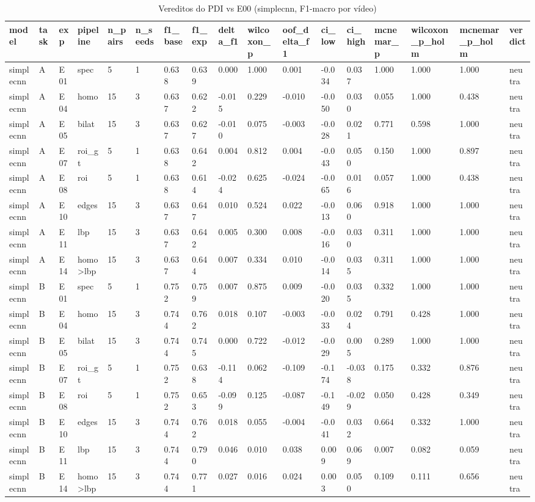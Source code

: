 \begin{table}[ht]
\centering
\caption{Vereditos do PDI vs E00 (simplecnn, F1-macro por vídeo)}
\begin{tabular}{lllllllllllllllll}
\toprule
model & task & exp & pipeline & n\_pairs & n\_seeds & f1\_base & f1\_exp & delta\_f1 & wilcoxon\_p & oof\_delta\_f1 & ci\_low & ci\_high & mcnemar\_p & wilcoxon\_p\_holm & mcnemar\_p\_holm & verdict \\
\midrule
simplecnn & A & E01 & spec & 5 & 1 & 0.638 & 0.639 & 0.000 & 1.000 & 0.001 & -0.034 & 0.037 & 1.000 & 1.000 & 1.000 & neutra \\
simplecnn & A & E04 & homo & 15 & 3 & 0.637 & 0.622 & -0.015 & 0.229 & -0.010 & -0.050 & 0.030 & 0.055 & 1.000 & 0.438 & neutra \\
simplecnn & A & E05 & bilat & 15 & 3 & 0.637 & 0.627 & -0.010 & 0.075 & -0.003 & -0.028 & 0.021 & 0.771 & 0.598 & 1.000 & neutra \\
simplecnn & A & E07 & roi\_gt & 5 & 1 & 0.638 & 0.642 & 0.004 & 0.812 & 0.004 & -0.043 & 0.050 & 0.150 & 1.000 & 0.897 & neutra \\
simplecnn & A & E08 & roi & 5 & 1 & 0.638 & 0.614 & -0.024 & 0.625 & -0.024 & -0.065 & 0.016 & 0.057 & 1.000 & 0.438 & neutra \\
simplecnn & A & E10 & edges & 15 & 3 & 0.637 & 0.647 & 0.010 & 0.524 & 0.022 & -0.013 & 0.060 & 0.918 & 1.000 & 1.000 & neutra \\
simplecnn & A & E11 & lbp & 15 & 3 & 0.637 & 0.642 & 0.005 & 0.300 & 0.008 & -0.016 & 0.030 & 0.311 & 1.000 & 1.000 & neutra \\
simplecnn & A & E14 & homo>lbp & 15 & 3 & 0.637 & 0.644 & 0.007 & 0.334 & 0.010 & -0.014 & 0.035 & 0.311 & 1.000 & 1.000 & neutra \\
simplecnn & B & E01 & spec & 5 & 1 & 0.752 & 0.759 & 0.007 & 0.875 & 0.009 & -0.020 & 0.035 & 0.332 & 1.000 & 1.000 & neutra \\
simplecnn & B & E04 & homo & 15 & 3 & 0.744 & 0.762 & 0.018 & 0.107 & -0.003 & -0.033 & 0.024 & 0.791 & 0.428 & 1.000 & neutra \\
simplecnn & B & E05 & bilat & 15 & 3 & 0.744 & 0.745 & 0.000 & 0.722 & -0.012 & -0.029 & 0.005 & 0.289 & 1.000 & 1.000 & neutra \\
simplecnn & B & E07 & roi\_gt & 5 & 1 & 0.752 & 0.638 & -0.114 & 0.062 & -0.109 & -0.174 & -0.038 & 0.175 & 0.332 & 0.876 & neutra \\
simplecnn & B & E08 & roi & 5 & 1 & 0.752 & 0.653 & -0.099 & 0.125 & -0.087 & -0.149 & -0.029 & 0.050 & 0.428 & 0.349 & neutra \\
simplecnn & B & E10 & edges & 15 & 3 & 0.744 & 0.762 & 0.018 & 0.055 & -0.004 & -0.041 & 0.032 & 0.664 & 0.332 & 1.000 & neutra \\
simplecnn & B & E11 & lbp & 15 & 3 & 0.744 & 0.790 & 0.046 & 0.010 & 0.038 & 0.009 & 0.069 & 0.007 & 0.082 & 0.059 & neutra \\
simplecnn & B & E14 & homo>lbp & 15 & 3 & 0.744 & 0.771 & 0.027 & 0.016 & 0.024 & 0.003 & 0.050 & 0.109 & 0.111 & 0.656 & neutra \\
\bottomrule
\end{tabular}
\end{table}